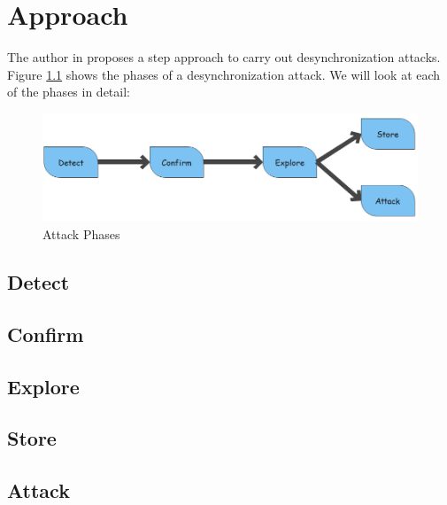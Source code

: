 \chapter{Approach}
The author in \cite{b6} proposes a step approach to carry out desynchronization attacks. Figure \ref{fig:Phases} shows the phases of a desynchronization attack. We will look at each of the phases in detail:
\begin{figure}
	\includegraphics[width=14cm]{images/Phases}
	\caption{Attack Phases}
	\label{fig:Phases}
\end{figure}
\section{Detect}
\section{Confirm}
\section{Explore}
\section{Store}
\section{Attack}